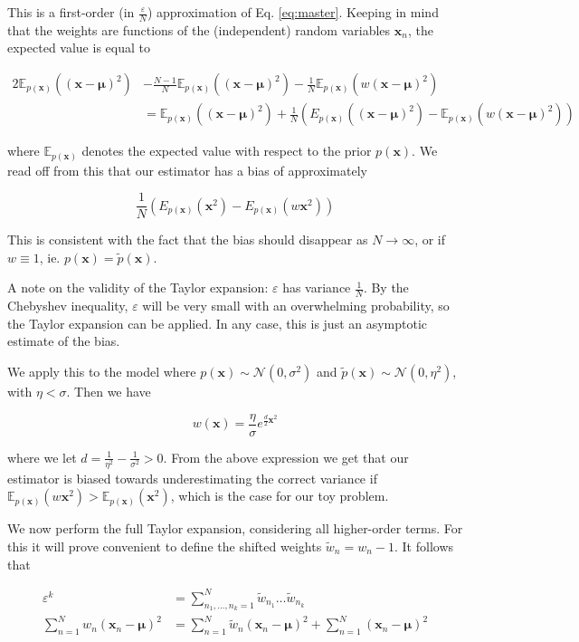 \documentclass[10pt,english]{article}
\newcommand{\E}{\mathbb{E}}
\newcommand{\mathbold}[1]{\ensuremath{\boldsymbol{\mathbf{#1}}}}
\newcommand{\bx}{\mathbold{x}}
\newcommand{\bmu}{\mathbold{\mu}}
\newcommand{\ptilde}{{\tilde{p}(\bx)}}
\newcommand{\px}{{p(\bx)}}
\def\eps{\varepsilon}
\begin{document}
\noindent This is a first-order (in $\frac \eps N$) approximation of Eq. \ref{eq:master}. Keeping in mind that the weights are functions of the (independent) random variables $\bx_n$, the expected value is equal to

\begin{align*}
2 \E_\px((\bx - \bmu)^2) &- \frac {N-1}{N} \E_\px((\bx - \bmu)^2) - \frac 1 N \E_\px(w(\bx - \bmu)^2) \\
&= \E_\px((\bx - \bmu)^2) + \frac 1 N \left(E_\px((\bx - \bmu)^2) - \E_\px(w(\bx - \bmu)^2)\right)
\end{align*} 

\noindent where $\E_\px$ denotes the expected value with respect to the prior $\px$. We read off from this that our estimator has a bias of approximately 

\[ \frac 1 {N} \left(E_\px(\bx^2) - E_\px(w\bx^2)\right) \]

\noindent This is consistent with the fact that the bias should disappear as $N \rightarrow \infty$, or if $w \equiv 1$, ie. $\px = \ptilde$.

A note on the validity of the Taylor expansion: $\eps$ has variance $\frac 1 N$. By the Chebyshev inequality, $\eps$ will be very small with an overwhelming probability, so the Taylor expansion can be applied. In any case, this is just an asymptotic estimate of the bias.

We apply this to the model where $\px \sim \mathcal{N}(0, \sigma^2)$ and $\ptilde \sim \mathcal{N}(0, \eta^2)$, with $\eta < \sigma$. Then we have

\[ w(\bx) = \frac{\eta}{\sigma} e^{\frac d 2 \bx^2} \]

\noindent where we let $d = \frac{1}{\eta^2} - \frac{1}{\sigma^2} > 0$. From the above expression we get that our estimator is biased towards underestimating the correct variance if $\E_\px(w\bx^2) > \E_\px(\bx^2)$, which is the case for our toy problem.


We now perform the full Taylor expansion, considering all higher-order terms. For this it will prove convenient to define the shifted weights $\tilde w_n = w_n - 1$. It follows that

\begin{align*}
\eps^k &= \sum_{n_1,\ldots,n_k=1}^N \tilde w_{n_1} \ldots \tilde w_{n_k} \\
\sum_{n=1}^N w_n (\bx_n - \bmu)^2 &= \sum_{n=1}^N \tilde w_n (\bx_n - \bmu)^2 + \sum_{n=1}^N (\bx_n - \bmu)^2
\end{align*}
\end{document}
